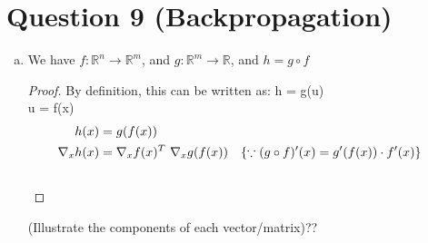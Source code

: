 \documentclass[fleqn]{article}
\begin{document}
\newpage

\section*{Question 9 (Backpropagation)}

\begin{enumerate}[a)]
    \item 
    We have $f: \mathbb{R}^n \rightarrow \mathbb{R}^m$, and $g: \mathbb{R}^m \rightarrow \mathbb{R}$, and $h = g \circ f$
    
    \begin{proof}
        By definition, this can be written as:
        h = g(u) \\
        u = f(x) \\
        \begin{align*}
            h(x) &= g(f(x))\\
            \nabla_x h(x) &= \nabla_x f(x) ^T ~ \nabla_x g(f(x)) && \{\because (g \circ f)'(x) = g'(f(x)) \cdot f'(x)\} \\
            &\qedhere
        \end{align*}
    \end{proof}
    
    (Illustrate the components of each vector/matrix)??
    

\end{enumerate}
\end{document}

